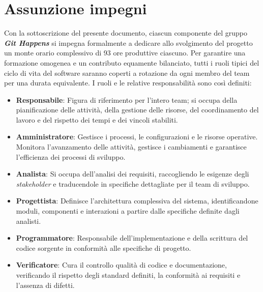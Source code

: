 \section{Assunzione impegni}
Con la sottoscrizione del presente documento, ciascun componente del gruppo \textit{\textbf{Git Happens}} si impegna formalmente a dedicare allo svolgimento del progetto un monte orario complessivo di 93 ore produttive ciascuno.
Per garantire una formazione omogenea e un contributo equamente bilanciato, tutti i ruoli tipici del ciclo di vita del software saranno coperti a rotazione da ogni membro del team per una durata equivalente.
I ruoli e le relative responsabilità sono così definiti:

\begin{itemize}
    \item \textbf{Responsabile}: Figura di riferimento per l'intero team; si occupa della pianificazione delle attività, della gestione delle risorse, del coordinamento del lavoro e del rispetto dei tempi e dei vincoli stabiliti.
    \item \textbf{Amministratore}: Gestisce i processi, le configurazioni e le risorse operative. Monitora l'avanzamento delle attività, gestisce i cambiamenti e garantisce l'efficienza dei processi di sviluppo.
    \item \textbf{Analista}: Si occupa dell'analisi dei requisiti, raccogliendo le esigenze degli \textit{stakeholder} e traducendole in specifiche dettagliate per il team di sviluppo.
    \item \textbf{Progettista}:  Definisce l'architettura complessiva del sistema, identificandone moduli, componenti e interazioni a partire dalle specifiche definite dagli analisti.
    \item \textbf{Programmatore}: Responsabile dell'implementazione e della scrittura del codice sorgente in conformità alle specifiche di progetto.
    \item \textbf{Verificatore}: Cura il controllo qualità di codice e documentazione, verificando il rispetto degli standard definiti, la conformità ai requisiti e l'assenza di difetti.
\end{itemize}